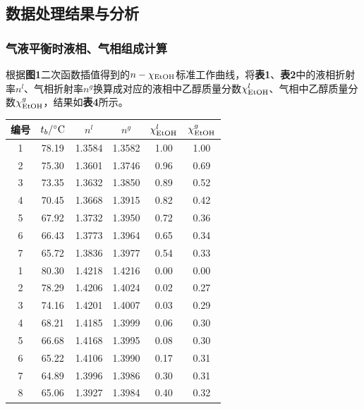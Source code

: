 \documentclass[12pt]{article}
\begin{document}
 \subsection{数据处理结果与分析}
 \subsubsection{气液平衡时液相、气相组成计算}
根据\textbf{图1}二次函数插值得到的$n-\chi_{\ce{EtOH}}$标准工作曲线，将\textbf{表1}、\textbf{表2}中的液相折射率$n^{l}$、气相折射率$n^{g}$换算成对应的液相中乙醇质量分数$\chi^{l}_{\ce{EtOH}}$、气相中乙醇质量分数$\chi^{g}_{\ce{EtOH}}$，结果如\textbf{表4}所示。
\begin{table}[h]
	\centering
	\begin{tabular}{cccccc}
		\toprule
		编号 & $t_{b}/{\rm ^{\circ}C}$ & $n^{l}$ & $n^{g}$ & $\chi^{l}_{\rm EtOH}$ & $\chi^{g}_{\ce{EtOH}}$ \\
		\midrule
	1 & 78.19 & 1.3584 & 1.3582 & 1.00 & 1.00 \\
	2 & 75.30 & 1.3601 & 1.3746 & 0.96 & 0.69 \\
	3 & 73.35 & 1.3632 & 1.3850 & 0.89 & 0.52 \\
	4 & 70.45 & 1.3668 & 1.3915 & 0.82 & 0.42 \\
	5 & 67.92 & 1.3732 & 1.3950 & 0.72 & 0.36 \\
	6 & 66.43 & 1.3773 & 1.3964 & 0.65 & 0.34 \\
	7 & 65.72 & 1.3836 & 1.3977 & 0.54 & 0.33 \\
		\midrule
	1 & 80.30 & 1.4218 & 1.4216 & 0.00 & 0.00 \\
	2 & 78.29 & 1.4206 & 1.4024 & 0.02 & 0.27 \\
	3 & 74.16 & 1.4201 & 1.4007 & 0.03 & 0.29 \\
	4 & 68.21 & 1.4185 & 1.3999 & 0.06 & 0.30 \\
	5 & 66.68 & 1.4168 & 1.3995 & 0.08 & 0.30 \\
	6 & 65.22 & 1.4106 & 1.3990 & 0.17 & 0.31 \\
	7 & 64.89 & 1.3996 & 1.3986 & 0.30 & 0.31 \\
	8 & 65.06 & 1.3927 & 1.3984 & 0.40 & 0.32 \\	
		\bottomrule
	\end{tabular}
\end{table}
\par
\end{document}
